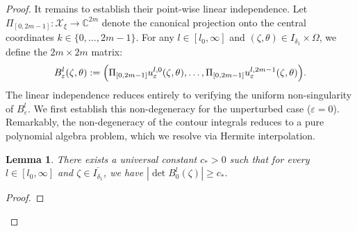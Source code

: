 \documentclass[reqno,11pt]{amsart}
\newtheorem{lemma}{Lemma}[section]
\newcommand{\C}{{\mathbb C}}
\begin{document}
\begin{proof}
It remains to establish their point-wise linear independence. Let $\Pi_{[0,2m-1]}: \mathcal{X}_\xi \to \C^{2m}$ denote the canonical projection onto the central coordinates $k \in \{0, \dots, 2m-1\}$. For any $l \in [l_0, \infty]$ and $(\zeta,\theta) \in I_{\delta_1} \times \Omega$, we define the $2m \times 2m$  matrix:
$$
B_\varepsilon^l(\zeta,\theta) := \Bigl( \Pi_{[0,2m-1]}u_{\varepsilon}^{l,0}(\zeta,\theta), \dots, \Pi_{[0,2m-1]}u_{\varepsilon}^{l,2m-1}(\zeta,\theta) \Bigr).
$$
The linear independence  reduces entirely to verifying the uniform non-singularity of $B_\varepsilon^l$. We first establish this non-degeneracy for the unperturbed case ($\varepsilon=0$). Remarkably, the non-degeneracy of the contour integrals reduces to a pure polynomial algebra problem, which we resolve via Hermite interpolation.

\begin{lemma}\label{lem:lindep-uniform}
There exists a universal constant $c_* > 0$ such that for every $l \in [l_0, \infty]$ and $\zeta \in \overline{I_{\delta_1}}$, we have
$
|\det B_0^l(\zeta)| \ge c_*.
$
\end{lemma}






\begin{proof}



\end{proof}
\end{proof}
\end{document}
